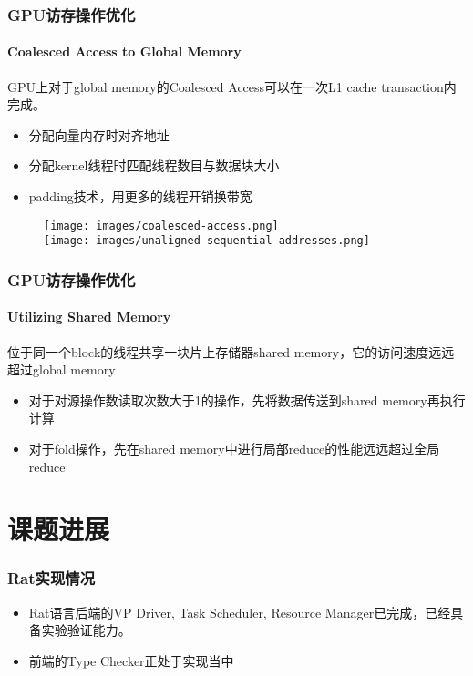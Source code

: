 \documentclass{beamer}
\begin{document}
\begin{frame}
  \frametitle{GPU访存操作优化}
  \framesubtitle{Coalesced Access to Global Memory}
  GPU上对于global memory的Coalesced Access可以在一次L1 cache transaction内完成。
  \begin{itemize}
    \item 分配向量内存时对齐地址
    \item 分配kernel线程时匹配线程数目与数据块大小
    \item padding技术，用更多的线程开销换带宽
  \end{itemize}
  \begin{figure}
    \texttt{[image: images/coalesced-access.png]}\\
    \texttt{[image: images/unaligned-sequential-addresses.png]}
  \end{figure}
\end{frame}

\begin{frame}
  \frametitle{GPU访存操作优化}
  \framesubtitle{Utilizing Shared Memory}
  位于同一个block的线程共享一块片上存储器shared memory，它的访问速度远远超过global memory
  \begin{itemize}
    \item 对于对源操作数读取次数大于1的操作，先将数据传送到shared memory再执行计算
    \item 对于fold操作，先在shared memory中进行局部reduce的性能远远超过全局reduce
  \end{itemize}
\end{frame}

\section{课题进展}
\frame{\tableofcontents[currentsection]}

\begin{frame}
  \frametitle{Rat实现情况}
  \begin{itemize}
    \item<1-> Rat语言后端的VP Driver, Task Scheduler, Resource Manager已完成，已经具备实验验证能力。
    \item<2-> 前端的Type Checker正处于实现当中
  \end{itemize}
\end{frame}
\end{document}
